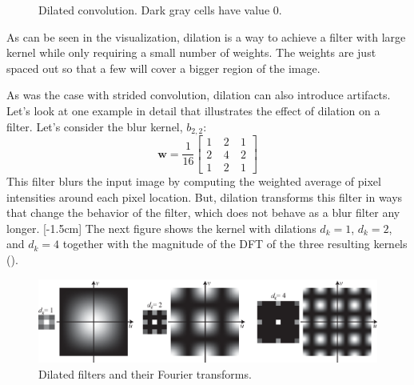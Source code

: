 \begin{figure}[h!]
{
  }
  \caption{Dilated convolution. Dark gray cells have value 0.}
  \label{fig:convolutional_neural_networks:dilated_conv_diagram}
\end{figure}

As can be seen in the visualization, dilation is a way to achieve a filter with large kernel while only requiring a small number of weights. The weights are just spaced out so that a few will cover a bigger region of the image.

As was the case with strided convolution, dilation can also introduce artifacts. Let's look at one example in detail that illustrates the effect of dilation on a filter. Let's consider the blur kernel, $b_{2,2}$:
\begin{equation}
\mathbf{w} = \frac{1}{16}
\begin{bmatrix}
  1 ~& 2 ~& 1 \\
  2 ~& 4 ~& 2\\
  1~& 2 ~& 1
\end{bmatrix}
\end{equation}
This filter blurs the input image by computing the weighted average of pixel intensities around each pixel location. But, dilation transforms this filter in ways that change the behavior of the filter, which does not behave as a blur filter any longer. 
[-1.5cm]
The next figure shows the kernel with dilations $d_k=1$, $d_k=2$, and $d_k=4$ together with the magnitude of the DFT of the three resulting kernels (\fig{\ref{fig:convolutional_neural_nets:aliasing_dilated_kernel_binomial}}). 


\begin{figure}[h]
\centerline{
    \includegraphics[width=1\linewidth]{./figures/convolutional_neural_nets/aliasing_dilated_kernel_binomial.eps}}
    \caption{Dilated filters and their Fourier transforms.}
    \label{fig:convolutional_neural_nets:aliasing_dilated_kernel_binomial}
\end{figure}
\vspace{-0.4cm}

